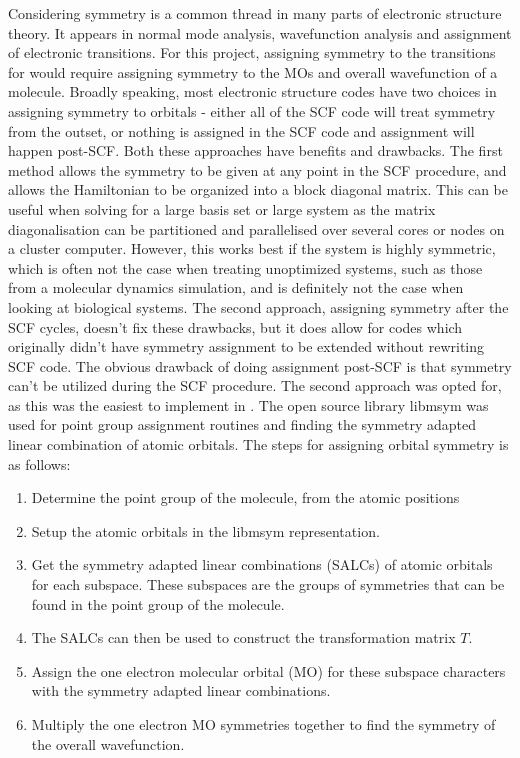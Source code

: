Considering symmetry is a common thread in many parts of electronic structure 
theory. It appears in normal mode analysis, wavefunction analysis and assignment
of electronic transitions. For this project, assigning symmetry to the transitions
for \dscf would require assigning symmetry to the MOs and overall wavefunction of
a molecule.
Broadly speaking, most electronic structure codes have two choices in assigning
symmetry to orbitals - either all of the SCF code will treat symmetry from the 
outset, or nothing is assigned in the SCF code and assignment will happen post-SCF.
Both these approaches have benefits and drawbacks. The first method allows the 
symmetry to be given at any point in the SCF procedure, and allows the Hamiltonian
to be organized into a block diagonal matrix. This can be useful when solving
for a large basis set or large system as the matrix diagonalisation can be
partitioned and parallelised over several cores or nodes on a cluster computer.
However, this works best if the system is highly symmetric, which is often not
the case when treating unoptimized systems, such as those from a molecular dynamics
simulation, and is definitely not the case when looking at biological systems.
The second approach, assigning symmetry after the SCF cycles, doesn't fix these
drawbacks, but it does allow for codes which originally didn't have symmetry
assignment to be extended without rewriting SCF code. The obvious drawback of
doing assignment post-SCF is that symmetry can't be utilized during the SCF procedure.
The second approach was opted for, as this was the easiest to implement in .
The open source library libmsym was used for point group assignment routines and finding
the symmetry adapted linear combination of atomic orbitals. The steps for assigning
orbital symmetry is as follows:

\begin{enumerate}
    \item Determine the point group of the molecule, from the atomic positions
    \item Setup the atomic orbitals in the libmsym representation.
    \item Get the symmetry adapted linear combinations (SALCs) of atomic orbitals for 
    each subspace. These subspaces are the groups of symmetries that can be found
    in the point group of the molecule.
    \item The SALCs can then be used to construct the transformation matrix $T$.
    \item Assign the one electron molecular orbital (MO) for these subspace characters
     with the symmetry adapted linear combinations.
    \item Multiply the one electron MO symmetries together to find the symmetry 
    of the overall wavefunction.
\end{enumerate}

